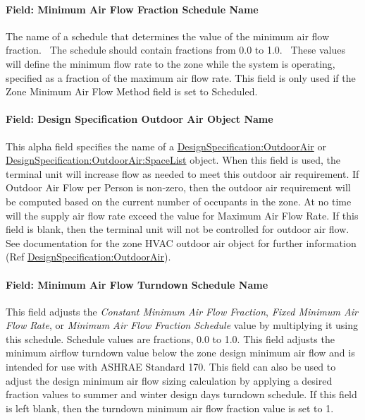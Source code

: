 \paragraph{Field: Minimum Air Flow Fraction Schedule Name}\label{field-minimum-air-flow-fraction-schedule-name-1}

The name of a schedule that determines the value of the minimum air flow fraction.~ The schedule should contain fractions from 0.0 to 1.0.~ These values will define the minimum flow rate to the zone while the system is operating, specified as a fraction of the maximum air flow rate. This field is only used if the Zone Minimum Air Flow Method field is set to Scheduled.

\paragraph{Field: Design Specification Outdoor Air Object Name}\label{field-design-specification-outdoor-air-object-name-1}

This alpha field specifies the name of a \hyperref[designspecificationoutdoorair]{DesignSpecification:OutdoorAir} or \hyperref[designspecificationoutdoorairspacelist]{DesignSpecification:OutdoorAir:SpaceList} object. When this field is used, the terminal unit will increase flow as needed to meet this outdoor air requirement. If Outdoor Air Flow per Person is non-zero, then the outdoor air requirement will be computed based on the current number of occupants in the zone. At no time will the supply air flow rate exceed the value for Maximum Air Flow Rate. If this field is blank, then the terminal unit will not be controlled for outdoor air flow. See documentation for the zone HVAC outdoor air object for further information (Ref \hyperref[designspecificationoutdoorair]{DesignSpecification:OutdoorAir}).

\paragraph{Field: Minimum Air Flow Turndown Schedule Name}

This field adjusts the \textit{Constant Minimum Air Flow Fraction}, \textit{Fixed Minimum Air Flow Rate}, or \textit{Minimum Air Flow Fraction Schedule} value by multiplying it using this schedule. Schedule values are fractions, 0.0 to 1.0. This field adjusts the minimum airflow turndown value below the zone design minimum air flow and is intended for use with ASHRAE Standard 170. This field can also be used to adjust the design minimum air flow sizing calculation by applying a desired fraction values to summer and winter design days turndown schedule. If this field is left blank, then the turndown minimum air flow fraction value is set to 1.

